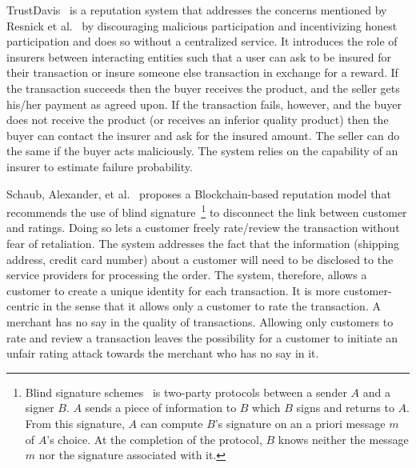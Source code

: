 TrustDavis~\cite{defigueiredo2005trustdavis} is a reputation system that
addresses the concerns mentioned by Resnick et al.~\cite{resnick2002trust} by
discouraging malicious participation and incentivizing honest participation and
does so without a centralized service. It introduces the role of insurers
between interacting entities such that a user can ask to be insured for their
transaction or insure someone else transaction in exchange for a reward. If the
transaction succeeds then the buyer receives the product, and the seller gets
his/her payment as agreed upon. If the transaction fails, however, and the
buyer does not receive the product (or receives an inferior quality product)
then the buyer can contact the insurer and ask for the insured amount. The
seller can do the same if the buyer acts maliciously. The system relies on the
capability of an insurer to estimate failure probability. \par
Schaub, Alexander, et al.~\cite{schaub2016trustless} proposes a
Blockchain-based reputation model that recommends the use of blind
signature~\footnote{Blind signature schemes~\cite{katz1996handbook} is
two-party protocols between a sender $A$ and a signer $B$. $A$ sends a piece of
information to $B$ which $B$ signs and returns to $A$. From this signature, $A$
can compute $B$'s signature on an a priori message $m$ of $A$'s choice. At the
completion of the protocol, $B$ knows neither the message $m$ nor the signature
associated with it.} to disconnect the link between customer and ratings. Doing
so lets a customer freely rate/review the transaction without fear of
retaliation. The system addresses the fact that the information (shipping
address, credit card number) about a customer will need to be disclosed to the
service providers for processing the order. The system, therefore, allows a
customer to create a unique identity for each transaction. It is more
customer-centric in the sense that it allows only a customer to rate the
transaction. A merchant has no say in the quality of transactions. Allowing
only customers to rate and review a transaction leaves the possibility for a
customer to initiate an unfair rating attack towards the merchant who has no
say in it.\par

